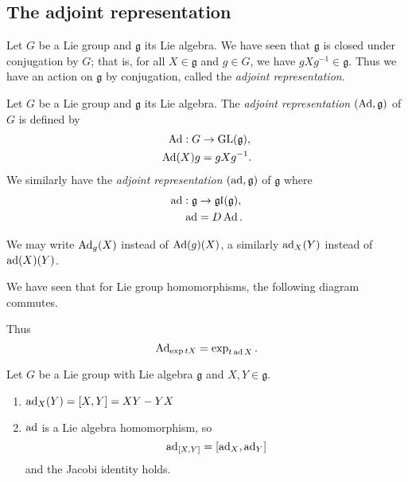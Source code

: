 \subsection{The adjoint representation}

Let $G$ be a Lie group and $\mathfrak g$ its Lie algebra. We have seen that $\mathfrak g$ is closed under conjugation by $G$; that is, for all $X \in \mathfrak g$ and $g \in G$, we have $gXg^{-1} \in \mathfrak g$. Thus we have an action on $\mathfrak g$ by conjugation, called the \emph{adjoint representation}.

\begin{definition}
    Let $G$ be a Lie group and $\mathfrak g$ its Lie algebra. The \emph{adjoint representation} $(\operatorname{Ad}, \mathfrak g)$ of $G$ is defined by
    \begin{align*}
        \operatorname{Ad}: G &\to \operatorname{GL}(\mathfrak g), \\
        \operatorname{Ad}(X)g &= gXg^{-1}.
    \end{align*}
    We similarly have the \emph{adjoint representation} $(\operatorname{ad}, \mathfrak g)$ of $\mathfrak g$ where
    \begin{align*}
        \operatorname{ad}: \mathfrak g &\to \mathfrak{gl}_{}(\mathfrak g), \\
        \operatorname{ad} &= D\operatorname{Ad}.
    \end{align*}
\end{definition}

We may write $\operatorname{Ad}_g(X)$ instead of $\operatorname{Ad}(g)(X)$, a similarly $\operatorname{ad}_X(Y)$ instead of $\operatorname{ad}(X)(Y)$. 

We have seen that for Lie group homomorphisms, the following diagram commutes.
\begin{center}
\end{center}
Thus 
\[ \operatorname{Ad}_{\exp{tX}} = \exp_{t\operatorname{ad} X}. \]

\begin{theorem}
    Let $G$ be a Lie group with Lie algebra $\mathfrak g$ and $X, Y \in \mathfrak g$.
    \begin{enumerate}
        \item $\operatorname{ad}_X(Y) = [X,Y] = XY - YX$
        \item $\operatorname{ad}$ is a Lie algebra homomorphism, so
        \[ \operatorname{ad}_{[X,Y]} = [\operatorname{ad}_X, \operatorname{ad}_Y] \]
        and the Jacobi identity holds. 
    \end{enumerate}
\end{theorem}

